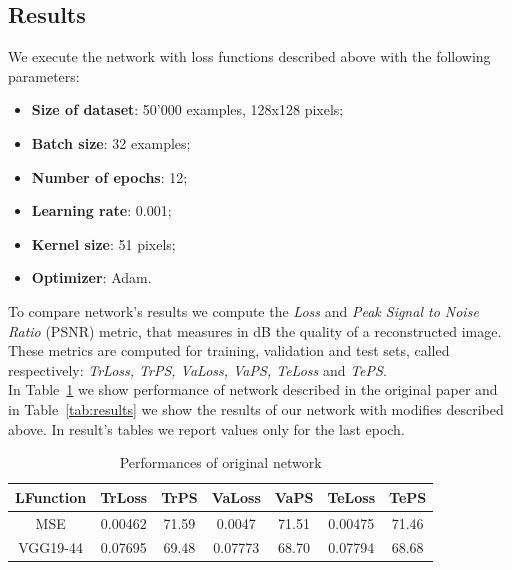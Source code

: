 \documentclass[11pt, a4paper]{article}
\begin{document}
	\subsection{Results}
	We execute the network with loss functions described above with the following parameters:
	\begin{itemize}
		\item \textbf{Size of dataset}: 50'000 examples, 128x128 pixels;
		\item \textbf{Batch size}: 32 examples;
		\item \textbf{Number of epochs}: 12;
		\item \textbf{Learning rate}: 0.001;
		\item \textbf{Kernel size}: 51 pixels;
		\item \textbf{Optimizer}: Adam.
	\end{itemize}
	To compare network's results we compute the \textit{Loss} and \textit{Peak Signal to Noise Ratio} (PSNR) metric, that measures in dB the quality of a reconstructed image. These metrics are computed for training, validation and test sets, called respectively: \textit{TrLoss, TrPS, VaLoss, VaPS, TeLoss} and \textit{TePS}.\\
	In Table~\ref{tab:old_results} we show performance of network described in the original paper \cite{mainpaper} and in Table~\ref{tab:results} we show the results of our network with modifies described above. In result's tables we report values only for the last epoch. 

	\begin{table}
		\centering
		\begin{tabular}{|c|c|c|c|c|c|c|}
			\hline
			\textbf{LFunction} & \textbf{TrLoss} & \textbf{TrPS} & \textbf{VaLoss} & \textbf{VaPS} & \textbf{TeLoss} & \textbf{TePS}\\
			\hline
			MSE & 0.00462 & 71.59 & 0.0047 & 71.51 & 0.00475 & 71.46\\
			\hline
			VGG19-44 & 0.07695 & 69.48 & 0.07773 & 68.70 & 0.07794 & 68.68\\
			\hline
		\end{tabular}
		\caption{Performances of original network}
		\label{tab:old_results}
	\end{table}
\end{document}
